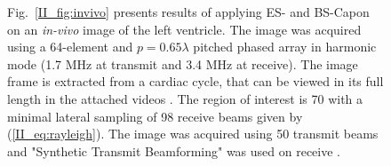\begin{figure}[!t]


Fig.\ \ref{II_fig:invivo} presents results of applying ES- and BS-Capon on an \textit{in-vivo} image of the left ventricle. The image was acquired using a 64-element and $p=0.65\lambda$ pitched phased array in harmonic mode (1.7 MHz at transmit and 3.4 MHz at receive). The image frame is extracted from a cardiac cycle, that can be viewed in its full length in the attached videos .
The region of interest is 70\degree{} with a minimal lateral sampling of 98 receive beams given by (\ref{II_eq:rayleigh}).
The image was acquired using 50 transmit beams and "Synthetic Transmit Beamforming" was used on receive \cite{Hergum2007}.  %



\end{figure}
